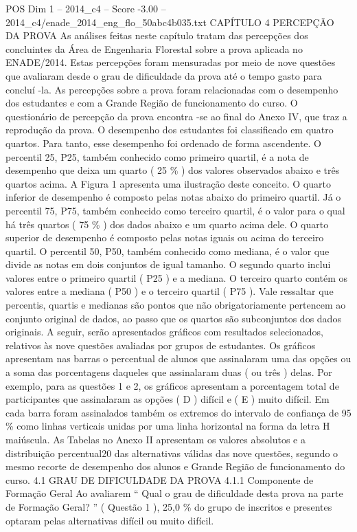 \begin{textsample}{POS Dim 1 – 2014\_c4 – Score -3.00 – 2014\_c4/enade\_2014\_eng\_flo\_50abc4b035.txt}  \label{ex:f1_pos_314}
CAPÍTULO 4 PERCEPÇÃO DA PROVA As análises feitas neste capítulo tratam das percepções dos concluintes da Área de Engenharia Florestal sobre a prova aplicada no ENADE/2014.
Estas percepções foram mensuradas por meio de nove questões que avaliaram desde o grau de dificuldade da prova até o tempo gasto para concluí -la.
As percepções sobre a prova foram relacionadas com o desempenho dos estudantes e com a Grande Região de funcionamento do curso.
O questionário de percepção da prova encontra -se ao final do Anexo IV, que traz a reprodução da prova.
O desempenho dos estudantes foi classificado em quatro quartos.
Para tanto, esse desempenho foi ordenado de forma ascendente.
O percentil 25, P25, também conhecido como primeiro quartil, é a nota de desempenho que deixa um quarto ( 25 \% ) dos valores observados abaixo e três quartos acima.
A Figura 1 apresenta uma ilustração deste conceito.
O quarto inferior de desempenho é composto pelas notas abaixo do primeiro quartil.
Já o percentil 75, P75, também conhecido como terceiro quartil, é o valor para o qual há três quartos ( 75 \% ) dos dados abaixo e um quarto acima dele.
O quarto superior de desempenho é composto pelas notas iguais ou acima do terceiro quartil.
O percentil 50, P50, também conhecido como mediana, é o valor que divide as notas em dois conjuntos de igual tamanho.
O segundo quarto inclui valores entre o primeiro quartil ( P25 ) e a mediana.
O terceiro quarto contém os valores entre a mediana ( P50 ) e o terceiro quartil ( P75 ).
Vale ressaltar que percentis, quartis e medianas são pontos que não obrigatoriamente pertencem ao conjunto original de dados, ao passo que os quartos são subconjuntos dos dados originais.
A seguir, serão apresentados gráficos com resultados selecionados, relativos às nove questões avaliadas por grupos de estudantes.
Os gráficos apresentam nas barras o percentual de alunos que assinalaram uma das opções ou a soma das porcentagens daqueles que assinalaram duas ( ou três ) delas.
Por exemplo, para as questões 1 e 2, os gráficos apresentam a porcentagem total de participantes que assinalaram as opções ( D ) difícil e ( E ) muito difícil.
Em cada barra foram assinalados também os extremos do intervalo de confiança de 95 \% como linhas verticais unidas por uma linha horizontal na forma da letra H maiúscula.
As Tabelas no Anexo II apresentam os valores absolutos e a distribuição percentual20 das alternativas válidas das nove questões, segundo o mesmo recorte de desempenho dos alunos e Grande Região de funcionamento do curso. 4.1 GRAU DE DIFICULDADE DA PROVA 4.1.1 Componente de Formação Geral Ao avaliarem “ Qual o grau de dificuldade desta prova na parte de Formação Geral? ” ( Questão 1 ), 25,0 \% do grupo de inscritos e presentes optaram pelas alternativas difícil ou muito difícil.

\end{textsample}
